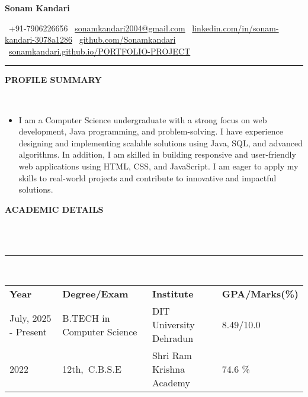 \documentclass[a4paper,10pt]{article}
\newcommand{\lsep}{-0.5cm}
\newcommand{\resheading}[1]{{\small \colorbox{mygrey}{\begin{minipage}{0.975\textwidth}{\textbf{#1 \vphantom{p\^{E}}}}\end{minipage}}}}
\begin{document}
\begin{center}
    {\Huge \textbf{Sonam Kandari}} \\
    \vspace{2pt}
\end{center}    

   \faPhone \ +91-7906226656 \quad
\faEnvelope \ \href{mailto:sonamkandari2004@gmail.com}{sonamkandari2004@gmail.com} \quad
\faLinkedin \ \href{http://www.linkedin.com/in/sonam-kandari-3078a1286}{linkedin.com/in/sonam-kandari-3078a1286} \quad
\faGithub \ \href{https://github.com/Sonamkandari}{github.com/Sonamkandari} \quad
\faGlobe \ \href{https://sonamkandari.github.io/PORTFOLIO-PROJECT/}{sonamkandari.github.io/PORTFOLIO-PROJECT}


\vspace{0.2cm}
\hrule
\vspace{0.4cm}


\resheading{\textbf{PROFILE SUMMARY}} \\[\lsep]
\begin{itemize}
\setlength\itemsep{0.5em}
\item I am a Computer Science undergraduate with a strong focus on web development, Java programming, and problem-solving. I have experience designing and implementing scalable solutions using Java, SQL, and advanced algorithms. In addition, I am skilled in building responsive and user-friendly web applications using HTML, CSS, and JavaScript. I am eager to apply my skills to real-world projects and contribute to innovative and impactful solutions.
\end{itemize}

\resheading{\textbf{ACADEMIC DETAILS} }\\[\lsep]
\\
\indent \rule{6.8in}{0.4pt}\\
\indent \begin{tabular}{ l @{\hskip 0.15in} l @{\hskip 0.15in} l @{\hskip 0.15in} l @{\hskip 0.15in} }
\noindent \textbf{Year} & \textbf{Degree/Exam} & \textbf{Institute} & \textbf{GPA/Marks(\%)}\\
July, 2025 - Present & B.TECH in Computer Science & DIT University Dehradun & 8.49/10.0 \ \\
2022 & 12th,\ C.B.S.E & Shri Ram Krishna Academy & 74.6 \% \\


\end{tabular}
\end{document}
